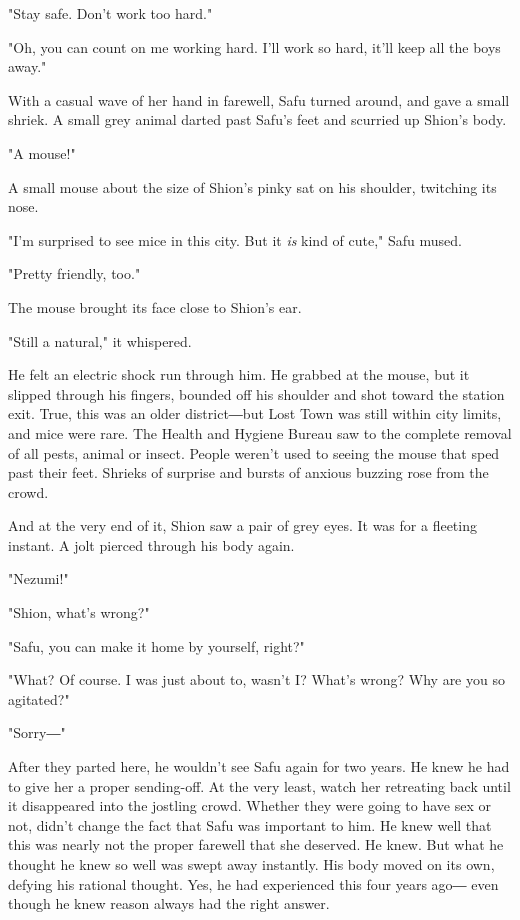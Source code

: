 "Stay safe. Don't work too hard."

"Oh, you can count on me working hard. I'll work so hard, it'll keep all
the boys away."

With a casual wave of her hand in farewell, Safu turned around, and gave
a small shriek. A small grey animal darted past Safu's feet and scurried
up Shion's body.

"A mouse!"

A small mouse about the size of Shion's pinky sat on his shoulder,
twitching its nose.

"I'm surprised to see mice in this city. But it \emph{is} kind of cute," Safu
mused.

"Pretty friendly, too."

The mouse brought its face close to Shion's ear.

"Still a natural," it whispered.

He felt an electric shock run through him. He grabbed at the mouse, but
it slipped through his fingers, bounded off his shoulder and shot toward
the station exit. True, this was an older district―but Lost Town was
still within city limits, and mice were rare. The Health and Hygiene
Bureau saw to the complete removal of all pests, animal or insect.
People weren't used to seeing the mouse that sped past their feet.
Shrieks of surprise and bursts of anxious buzzing rose from the crowd.

And at the very end of it, Shion saw a pair of grey eyes. It was for a
fleeting instant. A jolt pierced through his body again.

"Nezumi!"

"Shion, what's wrong?"

"Safu, you can make it home by yourself, right?"

"What? Of course. I was just about to, wasn't I? What's wrong? Why are
you so agitated?"

"Sorry―"

After they parted here, he wouldn't see Safu again for two years. He
knew he had to give her a proper sending-off. At the very least, watch
her retreating back until it disappeared into the jostling crowd.
Whether they were going to have sex or not, didn't change the fact that
Safu was important to him. He knew well that this was nearly not the
proper farewell that she deserved. He knew. But what he thought he knew
so well was swept away instantly. His body moved on its own, defying his
rational thought. Yes, he had experienced this four years ago― even
though he knew reason always had the right answer.

